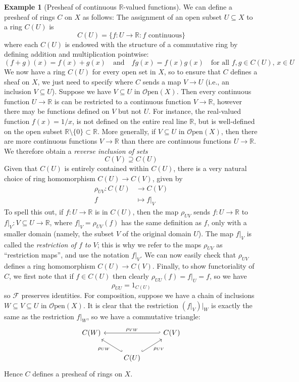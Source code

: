 \documentclass[10pt,oneside]{book}
\def\~#1{\mathscr{#1}}
\newcommand{\R}{\mathbb{R}}
\newcommand{\Open}{\~{O}\mathrm{pen}}
\theoremstyle{plain}
\theoremstyle{definition}
\newtheorem{ex}[thm]{Example}
\theoremstyle{remark}
\numberwithin{equation}{section}
\numberwithin{figure}{section}
\begin{document}
\begin{ex}[Presheaf of continuous $\R$-valued functions]
\label{ex:presheaf_cont_functions}
We can define a presheaf of rings $C$ on $X$ as follows: The assignment of an open subset $U \subseteq X$ to a ring $C(U)$ is 
    \[C(U) = \{f: U \to \R : f \text{ continuous} \}\]
where each $C(U)$ is endowed with the structure of a commutative ring by defining addition and multiplication pointwise:
\[(f + g)(x) = f(x) + g(x) \quad \text{and} \quad fg(x) = f(x)g(x) \quad \text{for all } f, g \in C(U), \, x \in U\]
We now have a ring $C(U)$ for every open set in $X$, so to ensure that $C$ defines a sheaf on $X$, we just need to specify where $C$ sends a map $V \to U$ (i.e., an inclusion $V \subseteq U$). Suppose we have $V \subseteq U$ in $\Open(X)$. Then every continuous function $U \to \R$ is can be restricted to a continuous function $V \to \R$, however there may be functions defined on $V$ but not $U$. For instance, the real-valued function $f(x) = 1/x$, is not defined on the entire real line $\R$, but is well-defined on the open subset $\R \setminus \{0\} \subset \R$. More generally, if $V \subseteq U$ in $\Open(X)$, then there are more continuous functions $V \to \R$ than there are continuous functions $U \to \R$. We therefore obtain a \emph{reverse inclusion of sets}
\[C(V) \supseteq C(U)\] 
Given that $C(U)$ is entirely contained within $C(U)$, there is a very natural choice of ring homomorphism $C(U) \to C(V)$, given by
\begin{align*}
    \rho_{UV}: C(U) &\to C(V) \\
    f &\mapsto f|_V
\end{align*}
To spell this out, if $f: U \to \R$ is in $C(U)$, then the map $\rho_{UV}$ sends $f: U \to \R$ to $f|_V: V \subseteq U \to \R$, where $f|_V = \rho_{UV}(f)$ has the same definition as $f$, only with a smaller domain (namely, the subset $V$ of the original domain $U$). The map $f|_V$ is called the \emph{restriction of $f$ to $V$}; this is why we refer to the maps $\rho_{UV}$ as ``restriction maps'', and use the notation $f|_V$. We can now easily check that $\rho_{UV}$ defines a ring homomorphism $C(U) \to C(V)$. Finally, to show functoriality of $C$, we first note that if $f \in C(U)$ then clearly $\rho_{UU}(f) = f|_U = f$, so we have  
\[\rho_{UU} = 1_{C(U)}\]
so $\~F$ preserves identities. For composition, suppose we have a chain of inclusions $W \subseteq V \subseteq U$ in $\Open(X)$. It is clear that the restriction $\left(f|_V \right)|_W$ is exactly the same as the restriction $f|_W$, so we have a commutative triangle: 
\[\begin{tikzcd}
    {C(W)} && {C(V)} \\
    & {C(U)}
    \arrow["{\rho_{UW}}", hook', from=2-2, to=1-1]
    \arrow["{\rho_{VW}}"', hook', from=1-3, to=1-1]
    \arrow["{\rho_{UV}}"', hook, from=2-2, to=1-3]
\end{tikzcd}\]
Hence $C$ defines a presheaf of rings on $X$.
\end{ex}
\end{document}
